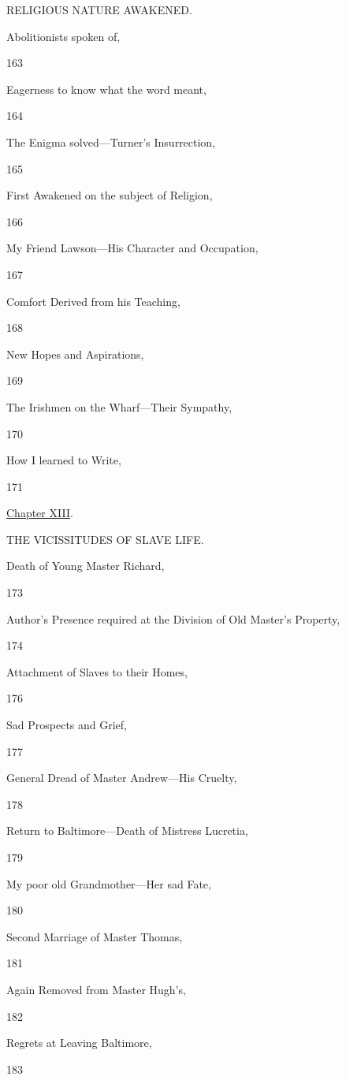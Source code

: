 RELIGIOUS NATURE AWAKENED.

Abolitionists spoken of,

163

Eagerness to know what the word meant,

164

The Enigma solved---Turner's Insurrection,

165

First Awakened on the subject of Religion,

166

My Friend Lawson---His Character and Occupation,

167

Comfort Derived from his Teaching,

168

New Hopes and Aspirations,

169

The Irishmen on the Wharf---Their Sympathy,

170

How I learned to Write,

171

\href{/wiki/My_Bondage_and_My_Freedom_(1855)/Chapter_XIII}{Chapter
XIII}.

THE VICISSITUDES OF SLAVE LIFE.

Death of Young Master Richard,

173

Author's Presence required at the Division of Old Master's Property,

174

Attachment of Slaves to their Homes,

176

Sad Prospects and Grief,

177

General Dread of Master Andrew---His Cruelty,

178

Return to Baltimore---Death of Mistress Lucretia,

179

My poor old Grandmother---Her sad Fate,

180

Second Marriage of Master Thomas,

181

Again Removed from Master Hugh's,

182

Regrets at Leaving Baltimore,

183

